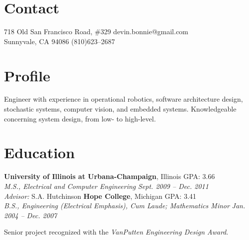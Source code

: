 \documentclass[margin, line]{resume}
\begin{document}
\begin{resume}
\vspace{-2mm}
    \section{\mysidestyle Contact}

	718 Old San Francisco Road, \#329		  \hfill devin.bonnie@gmail.com \\ \vspace{-2mm}%
	Sunnyvale, CA 94086                           \hfill   (810)623--2687 \vspace{0mm}\vspace{-2mm}%
    \section{\mysidestyle Profile}
   
Engineer with experience in operational robotics, software architecture design, stochastic systems, computer vision, and embedded systems. Knowledgeable concerning system design, from low- to high-level.  \vspace{-4mm}
    \section{\mysidestyle Education}
    \textbf{University of Illinois at Urbana-Champaign}, Illinois  \hfill GPA: 3.66 \vspace{0mm}\\%
    \textsl{M.S., Electrical and Computer Engineering} \hfill \textsl{Sept. 2009 -- Dec. 2011}\\
    \textsl{Advisor:} S.A. Hutchinson \vspace{-2mm} %
    \textbf{Hope College}, Michigan  \hfill GPA: 3.41\vspace{0mm}\\%
    \textsl{B.S., Engineering (Electrical Emphasis), Cum Laude; Mathematics Minor} \hfill \textsl{Jan. 2004 -- Dec. 2007}\vspace{-3mm}\\\vspace{-1mm}%
    \begin{list2}
        \item Senior project recognized with the \textit{VanPutten Engineering Design Award}.
    \end{list2}\vspace{-2mm}


\end{resume}
\end{document}
